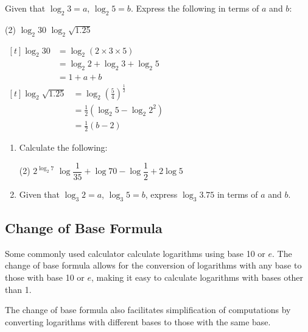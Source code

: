 \documentclass{report}
\begin{document}
\begin{question}
	Given that $\log_2 3 = a$, $\log_2 5 = b$. Express the following in terms of $a$ and $b$:
	\begin{tasks}[label=(\alph*)](2)
		\task $\log _2 30$
		\task $\log _2 \sqrt{1.25}$
	\end{tasks}
	
	\sol{}
	\begin{tasks}[label=(\alph*)]
		\task
		$
		\begin{aligned}[t]
			\log _2 30 & =\log _2(2 \times 3 \times 5)  \\
			           & =\log _2 2+\log _2 3+\log _2 5 \\
			           & =1+a+b                         
		\end{aligned}
		$
		\task
		$
		\begin{aligned}[t]
			\log _2 \sqrt{1.25} & =\log _2\left(\frac{5}{4}\right)^{\frac{1}{2}} \\
			                    & =\frac{1}{2}\left(\log _2 5-\log _2 2^2\right) \\
			                    & =\frac{1}{2}(b-2)                              
		\end{aligned}
		$
	\end{tasks}
\end{question}

\begin{enumerate}
	\item Calculate the following:
	      \begin{tasks}[label=(\alph*)](2)
	      	\task $2^{\log _2 7}$
	      	\task $\log \dfrac{1}{35}+\log 70-\log \dfrac{1}{2}+2 \log 5$
	      \end{tasks}
	      
	\item Given that $\log_3 2 = a$, $\log_3 5 = b$, express $\log_3 3.75$ in terms of $a$ and $b$.
\end{enumerate}

\subsection*{Change of Base Formula}

Some commonly used calculator calculate logarithms using base 10 or $e$. The change of base formula allows for the conversion of logarithms with any base to those with base 10 or $e$, making it easy to calculate logarithms with bases other than 1.
        
The change of base formula also facilitates simplification of computations by converting logarithms with different bases to those with the same base.
\end{document}
